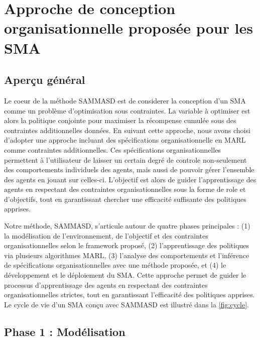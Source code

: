 \documentclass[sigconf,anonymous]{aamas}
\begin{document}
\section{Approche de conception organisationnelle proposée pour les SMA}
\label{sec:approach}

\subsection{Aperçu général}

Le coeur de la méthode SAMMASD est de considerer la conception d'un SMA comme un problème d'optimisation sous contraintes. La variable à optimiser est alors la politique conjointe pour maximiser la récompense cumulée sous des contraintes additionnelles données. En suivant cette approche, nous avons choisi d'adopter une approche incluant des spécifications organisationnelle en MARL comme contraintes additionnelles. Ces spécifications organisationnelles permettent à l'utilisateur de laisser un certain degré de controle non-seulement des comportements individuels des agents, mais aussi de pouvoir gérer l'ensemble des agents en jouant sur celles-ci.
L'objectif est alors de guider l'apprentissage des agents en respectant des contraintes organisationnelles sous la forme de role et d'objectifs, tout en garantissant chercher une efficacité suffisante des politiques apprises.

Notre méthode, SAMMASD, s'articule autour de quatre phases principales : (1) la modélisation de l'environnement, de l'objectif et des contraintes organisationnelles selon le framework proposé, (2) l'apprentissage des politiques via plusieurs algorithmes MARL, (3) l'analyse des comportements et l'inférence de spécifications organisationnelles avec une méthode proposée, et (4) le développement et le déploiement du SMA. Cette approche permet de guider le processus d'apprentissage des agents en respectant des contraintes organisationnelles strictes, tout en garantissant l'efficacité des politiques apprises. Le cycle de vie d'un SMA conçu avec SAMMASD est illustré dans la \autoref{fig:cycle}.


\subsection{Phase 1 : Modélisation}
\end{document}
